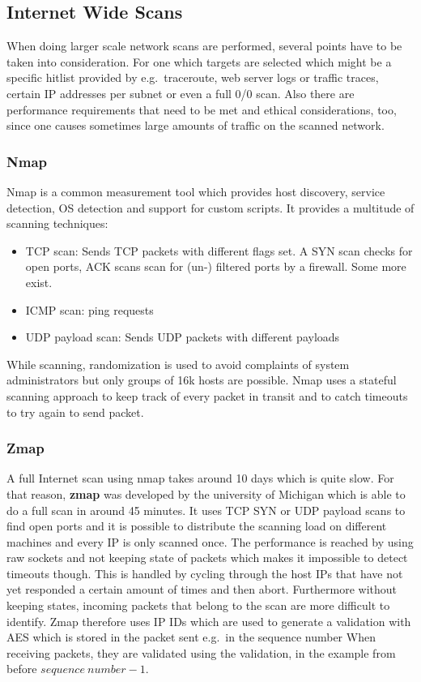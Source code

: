 \subsection{Internet Wide Scans}
When doing larger scale network scans are performed, several points have to be taken into consideration.
For one which targets are selected which might be a specific hitlist provided by e.g.\ traceroute, web server logs or traffic traces, certain IP addresses per subnet or even a full 0/0 scan.
Also there are performance requirements that need to be met and ethical considerations, too, since one causes sometimes large amounts of traffic on the scanned network.\\
\vspace{4pt}

\subsubsection*{Nmap}
Nmap is a common measurement tool which provides host discovery, service detection, OS detection and support for custom scripts.
It provides a multitude of scanning techniques:
\begin{itemize}
  \item TCP scan: Sends TCP packets with different flags set. A SYN scan checks for open ports, ACK scans scan for (un-) filtered ports by a firewall. Some more exist.
  \item ICMP scan: ping requests
  \item UDP payload scan: Sends UDP packets with different payloads
\end{itemize}
While scanning, randomization is used to avoid complaints of system administrators but only groups of 16k hosts are possible.
Nmap uses a stateful scanning approach to keep track of every packet in transit and to catch timeouts to try again to send packet.\\

\subsubsection*{Zmap}
A full Internet scan using nmap takes around 10 days which is quite slow.
For that reason, \textbf{zmap} was developed by the university of Michigan which is able to do a full scan in around 45 minutes.
It uses TCP SYN or UDP payload scans to find open ports and it is possible to distribute the scanning load on different machines and every IP is only scanned once.
The performance is reached by using raw sockets and not keeping state of packets which makes it impossible to detect timeouts though.
This is handled by cycling through the host IPs that have not yet responded a certain amount of times and then abort.
Furthermore without keeping states, incoming packets that belong to the scan are more difficult to identify.
Zmap therefore uses IP IDs which are used to generate a validation with AES which is stored in the packet sent e.g.\ in the sequence number
When receiving packets, they are validated using the validation, in the example from before $sequence~number- 1$.

